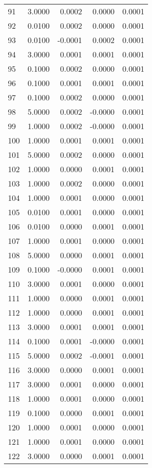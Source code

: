 \begin{longtable}{lrrrr}
91 & 3.0000 & 0.0002 & 0.0000 & 0.0001 \\
92 & 0.0100 & 0.0002 & 0.0000 & 0.0001 \\
93 & 0.0100 & -0.0001 & 0.0002 & 0.0001 \\
94 & 3.0000 & 0.0001 & 0.0001 & 0.0001 \\
95 & 0.1000 & 0.0002 & 0.0000 & 0.0001 \\
96 & 0.1000 & 0.0001 & 0.0001 & 0.0001 \\
97 & 0.1000 & 0.0002 & 0.0000 & 0.0001 \\
98 & 5.0000 & 0.0002 & -0.0000 & 0.0001 \\
99 & 1.0000 & 0.0002 & -0.0000 & 0.0001 \\
100 & 1.0000 & 0.0001 & 0.0001 & 0.0001 \\
101 & 5.0000 & 0.0002 & 0.0000 & 0.0001 \\
102 & 1.0000 & 0.0000 & 0.0001 & 0.0001 \\
103 & 1.0000 & 0.0002 & 0.0000 & 0.0001 \\
104 & 1.0000 & 0.0001 & 0.0000 & 0.0001 \\
105 & 0.0100 & 0.0001 & 0.0000 & 0.0001 \\
106 & 0.0100 & 0.0000 & 0.0001 & 0.0001 \\
107 & 1.0000 & 0.0001 & 0.0000 & 0.0001 \\
108 & 5.0000 & 0.0000 & 0.0001 & 0.0001 \\
109 & 0.1000 & -0.0000 & 0.0001 & 0.0001 \\
110 & 3.0000 & 0.0001 & 0.0000 & 0.0001 \\
111 & 1.0000 & 0.0000 & 0.0001 & 0.0001 \\
112 & 1.0000 & 0.0000 & 0.0001 & 0.0001 \\
113 & 3.0000 & 0.0001 & 0.0001 & 0.0001 \\
114 & 0.1000 & 0.0001 & -0.0000 & 0.0001 \\
115 & 5.0000 & 0.0002 & -0.0001 & 0.0001 \\
116 & 3.0000 & 0.0000 & 0.0001 & 0.0001 \\
117 & 3.0000 & 0.0001 & 0.0000 & 0.0001 \\
118 & 1.0000 & 0.0001 & 0.0000 & 0.0001 \\
119 & 0.1000 & 0.0000 & 0.0001 & 0.0001 \\
120 & 1.0000 & 0.0001 & 0.0000 & 0.0001 \\
121 & 1.0000 & 0.0001 & 0.0000 & 0.0001 \\
122 & 3.0000 & 0.0000 & 0.0001 & 0.0001 \\

\end{longtable}
